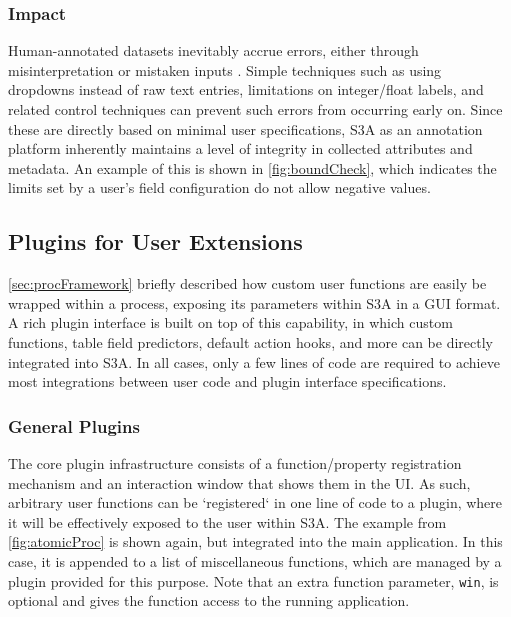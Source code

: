 \makeStandFilterFig

\subsubsection{Impact}
Human-annotated datasets inevitably accrue errors, either through misinterpretation or mistaken inputs \cite{Dai_crowdSourceWorkflows,Russakovsky_humanCollabAnnotation2015,Radenovic_CNNNoHuman}. Simple techniques such as using dropdowns instead of raw text entries, limitations on integer/float labels, and related control techniques can prevent such errors from occurring early on. Since these are directly based on minimal user specifications, S3A as an annotation platform inherently maintains a level of integrity in collected attributes and metadata. An example of this is shown in \autoref{fig:boundCheck}, which indicates the limits set by a user's field configuration do not allow negative values.

\makeBoundCheckFig

\subsection{Plugins for User Extensions}\label{sec:plugins}
\autoref{sec:procFramework} briefly described how custom user functions are easily be wrapped within a process, exposing its parameters within S3A in a GUI format. A rich plugin interface is built on top of this capability, in which custom functions, table field predictors, default action hooks, and more can be directly integrated into S3A. In all cases, only a few lines of code are required to achieve most integrations between user code and plugin interface specifications.

\subsubsection{General Plugins}
The core plugin infrastructure consists of a function/property registration mechanism and an interaction window that shows them in the UI. As such, arbitrary user functions can be `registered` in one line of code to a plugin, where it will be effectively exposed to the user within S3A. The example from \autoref{fig:atomicProc} is shown again, but integrated into the main application. In this case, it is appended to a list of miscellaneous functions, which are managed by a plugin provided for this purpose. Note that an extra function parameter, \texttt{win}, is optional and gives the function access to the running application.

